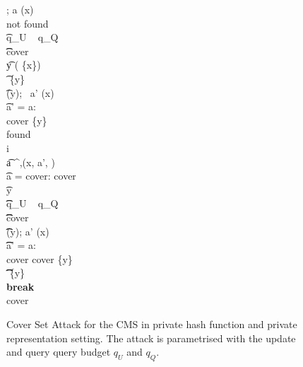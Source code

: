 \begin{figure*}[ht!]
\begin{pchstack}[boxed,center,space=0.5em]
{				 \gets \emptyset; a \gets \QRYO(x) \\
				\hspace{-.5em}
				\pcwhile \textrm{not found} \\
				\t \pcif q_U \ \UPO {} q_Q \ \QRYO{}\\
				\t \t \pcreturn \textrm{cover} \\
				\t y \getsr \univ \setminus ( \cup \{x\})\\
				\t \streamvar{I} \gets {} \cup \{y\}\\
				\t \UPO(y); \ a' \gets \QRYO(x)\\
				\t \pcif a' \not= a: \\
				\t \t \textrm{cover} \gets \{y\}\\
				\t \t \textrm{found} \gets {}\\
				\pcfor i \in [2, 3, \dots, k]\label{alg:CMS:CK:change}\\
				\t a \gets {}^{\UPO,\QRYO}(x, a', ) \\
				\t \pcif a = \textrm{cover}: \pcreturn \textrm{cover}\\
				\t \pcfor y \in {} \ \\
				\t \t \pcif q_U \ \UPO {} q_Q \ \QRYO{}\\
				\t \t \t \pcreturn \textrm{cover}\\
				\t \t \UPO(y); a' \gets \QRYO(x) \\
				\t \t \pcif a' \not= a: \\
				\t \t \t \textrm{cover} \gets \textrm{cover} \cup \{y\}\\
				\t \t \t {} \gets {} \setminus \{y\}\\
				\t \t \t \textbf{break}\\
				\pcreturn \textrm{cover}
			}
		\end{pchstack}
	\caption[Private Hash and Private Representation CMS Attack.]{Cover Set Attack for the CMS in private
		hash function and private representation setting. 
		The attack is parametrised with  the update and query query budget $q_U$ and $q_Q$.
	}
	\label{fig:attack-cms-iqcsa}
\end{figure*}


